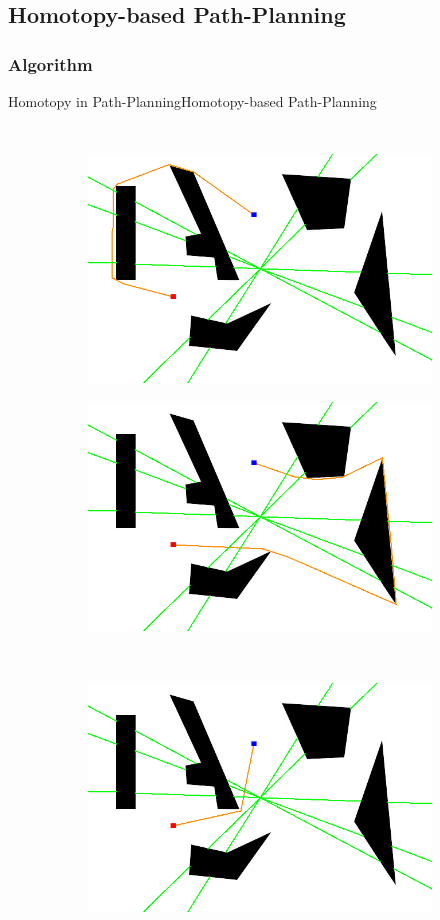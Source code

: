 \subsection{Homotopy-based Path-Planning}

\subsubsection{Algorithm}

\begin{frame}{Homotopy in Path-Planning}{Homotopy-based Path-Planning}
	
\begin{columns}
\begin{figure}
	\centering
	\begin{subfigure}
		\centering
		\includegraphics[width=.47\textwidth]{figure/all_homotopy_classes/s1.png}
	\end{subfigure}  
	\begin{subfigure}
		\centering
		\includegraphics[width=.47\textwidth]{figure/all_homotopy_classes/s2.png}
	\end{subfigure}
	\\
	\begin{subfigure}
		\centering
		\includegraphics[width=.47\textwidth]{figure/all_homotopy_classes/s3.png}

\end{subfigure}
\end{figure}
\end{columns}
\end{frame}
